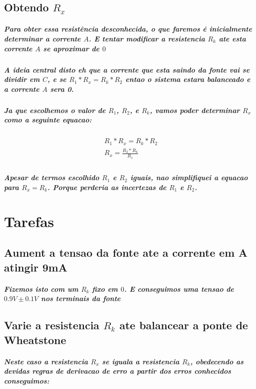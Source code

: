 \documentclass[12pt,twoside, a4paper, twocolumn]{article}
\begin{document}
\subsection{Obtendo $R_x$}

\subparagraph*{Para obter essa resistência desconhecida, o que faremos é inicialmente determinar a corrente $A$. E tentar modificar a resistencia $R_k$ ate esta corrente $A$ se aproximar de $0$}

\subparagraph*{A ideia central disto eh que a corrente que esta saindo da fonte vai se dividir em $C$, e se $R_1 * R_x = R_k * R_2$ entao o sistema estara balanceado e a corrente $A$ sera 0.}

\subparagraph*{Ja que escolhemos o valor de $R_1$, $R_2$, e $R_k$, vamos poder determinar $R_x$ como a seguinte equacao:}


\begin{equation}
    \begin{aligned}
         & R_1 * R_x  = R_k * R_2       \\
         & R_x = \frac{R_2 * R_k}{R_1 } \\
    \end{aligned}
\end{equation}

\subparagraph*{Apesar de termos escolhido $R_1$ e $R_2$ iguais, nao simplifiquei a equacao para $R_x = R_k$. Porque perderia as incertezas de $R_1$ e $R_2$. }




\section{Tarefas}

\subsection{Aument a tensao da fonte ate a corrente em A atingir 9mA}

\subparagraph*{Fizemos isto com um $R_k$ fixo em $0$. E conseguimos uma tensao de $0.9V \pm 0.1V$ nos terminais da fonte}

\subsection{Varie a resistencia $R_k$ ate balancear a ponte de Wheatstone}

\subparagraph*{Neste caso a resistencia $R_x$ se iguala a resistencia $R_k$, obedecendo as devidas regras de derivacao de erro a partir dos erros conhecidos conseguimos:}
\end{document}
